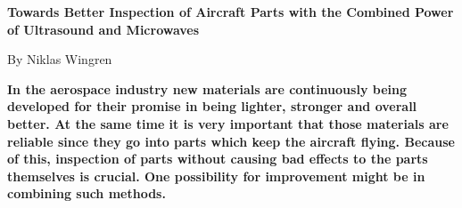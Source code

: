 \documentclass[11pt]{article}
\begin{document}
	
	\begingroup
		\centering
		\LARGE \textbf{Towards Better Inspection of Aircraft Parts with the Combined Power of Ultrasound and Microwaves} \par
		\vspace{0.5cm}
		\centering
		\normalsize By Niklas Wingren \par
		\vspace{0.5cm}
	\endgroup
	
	\noindent
	\textbf{
		In the aerospace industry new materials are continuously being developed for their promise in being lighter, stronger and overall better. At the same time it is very important that those materials are reliable since they go into parts which keep the aircraft flying. Because of this, inspection of parts without causing bad effects to the parts themselves is crucial. One possibility for improvement might be in combining such methods.
	}
\end{document}
